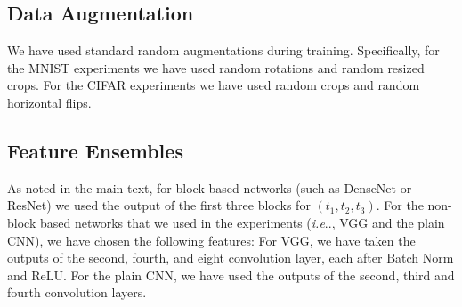 \documentclass[accepted]{uai2022} %
\makeatletter
\DeclareRobustCommand\onedot{\futurelet\@let@token\@onedot}
\def\@onedot{\ifx\@let@token.\else.\null\fi\xspace}
\def\ie{\emph{i.e}\onedot} \def\Ie{\emph{I.e}\onedot}
\makeatother
\begin{document}
\subsection{Data Augmentation}
We have used standard random augmentations during training. Specifically, 
for the MNIST experiments we have used random rotations and random resized crops.
For the CIFAR experiments we have used random crops and random horizontal flips.


\subsection{Feature Ensembles}
As noted in the main text,
for block-based networks (such as DenseNet or ResNet) we used the output of the first three blocks for $(t_1,t_2,t_3)$.
For the non-block based networks that we used in the experiments (\ie, VGG and the plain CNN), we have chosen the following features:
For VGG, we have taken the outputs of the second, fourth, and eight convolution layer, each after Batch Norm and ReLU.
For the plain CNN, we have used the outputs of the second, third and fourth convolution layers.
\end{document}
